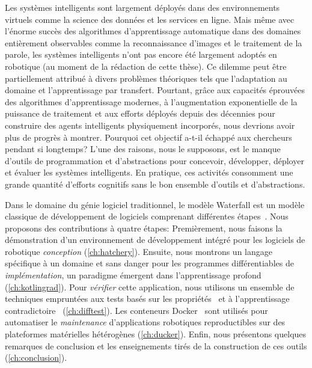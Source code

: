Les systèmes intelligents sont largement déployés dans des environnements virtuels comme la science des données et les services en ligne. Mais même avec l'énorme succès des algorithmes d'apprentissage automatique dans des domaines entièrement observables comme la reconnaissance d'images et le traitement de la parole, les systèmes intelligents n'ont pas encore été largement adoptés en robotique (au moment de la rédaction de cette thèse). Ce dilemme peut être partiellement attribué à divers problèmes théoriques tels que l'adaptation au domaine et l'apprentissage par transfert. Pourtant, grâce aux capacités éprouvées des algorithmes d'apprentissage modernes, à l'augmentation exponentielle de la puissance de traitement et aux efforts déployés depuis des décennies pour construire des agents intelligents physiquement incorporés, nous devrions avoir plus de progrès à montrer. Pourquoi cet objectif a-t-il échappé aux chercheurs pendant si longtemps? L'une des raisons, nous le supposons, est le manque d'outils de programmation et d'abstractions pour concevoir, développer, déployer et évaluer les systèmes intelligents. En pratique, ces activités consomment une grande quantité d'efforts cognitifs sans le bon ensemble d'outils et d'abstractions.

Dans le domaine du génie logiciel traditionnel, le modèle Waterfall est un modèle classique de développement de logiciels comprenant différentes étapes~\citep{royce1987managing}. Nous proposons des contributions à quatre étapes: Premièrement, nous faisons la démonstration d'un environnement de développement intégré pour les logiciels de robotique \textit{conception} (\autoref{ch:hatchery}). Ensuite, nous montrons un langage spécifique à un domaine et sans danger pour les programmes différentiables de \textit{implémentation}, un paradigme émergent dans l'apprentissage profond (\autoref{ch:kotlingrad}). Pour \textit{vérifier} cette application, nous utilisons un ensemble de techniques empruntées aux tests basés sur les propriétés~\citep{fink1997property} et à l'apprentissage contradictoire~\citep{lowd2005adversarial} (\autoref{ch:difftest}). Les conteneurs Docker~\citep{merkel2014docker} sont utilisés pour automatiser le \textit{maintenance} d'applications robotiques reproductibles sur des plateformes matérielles hétérogènes (\autoref{ch:ducker}). Enfin, nous présentons quelques remarques de conclusion et les enseignements tirés de la construction de ces outils (\autoref{ch:conclusion}).


